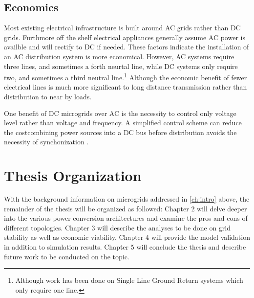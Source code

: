 \subsection{Economics}
Most existing electrical infrastructure is built around AC grids rather than DC grids. Furthmore off the shelf electrical appliances generally assume AC power is availble and will rectify to DC if needed. These factors indicate the installation of an AC distribution system is more economical. However, AC systems require three lines, and sometimes a forth neurtal line, while DC systems only require two, and sometimes a third neutral line.\footnote{Although work has been done on Single Line Ground Return systems which only require one line.} Although the economic benefit of fewer electrical lines is much more significant to long distance transmission rather than distribution to near by loads.

One benefit of DC microgrids over AC is the necessity to control only voltage level rather than voltage and frequency. A simplified control scheme can reduce the costcombining power sources into a DC bus before distribution avoids the necessity of synchonization \cite{Lotfi2015}.

\section{Thesis Organization}
With the background information on microgrids addressed in \autoref{ch:intro} above, the remainder of the thesis will be organized as followed: Chapter 2 will delve deeper into the various power conversion architectures and examine the pros and cons of different topologies. Chapter 3 will describe the analyses to be done on grid stability as well as economic viability. Chapter 4 will provide the model validation in addition to simulation results. Chapter 5 will conclude the thesis and describe future work to be conducted on the topic.

